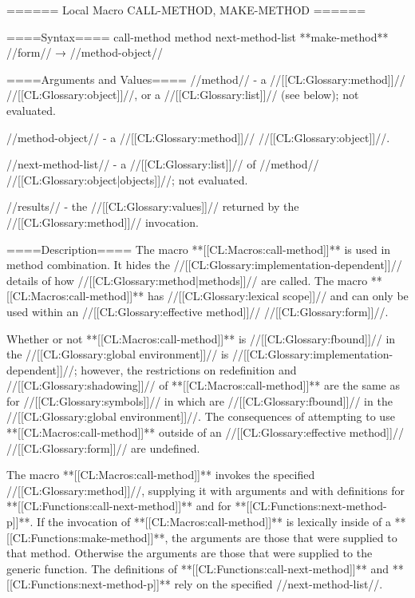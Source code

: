 ====== Local Macro CALL-METHOD, MAKE-METHOD ======

====Syntax====
\DefmacWithValues call-method {method {\optional} next-method-list} {} **make-method** //form// → //method-object//

====Arguments and Values====
//method// - a //[[CL:Glossary:method]]// //[[CL:Glossary:object]]//, or a //[[CL:Glossary:list]]// (see below); not evaluated.

//method-object// - a //[[CL:Glossary:method]]// //[[CL:Glossary:object]]//.

//next-method-list// - a //[[CL:Glossary:list]]// of //method// //[[CL:Glossary:object|objects]]//; not evaluated.

//results// - the //[[CL:Glossary:values]]// returned by the //[[CL:Glossary:method]]// invocation.

====Description====
The macro **[[CL:Macros:call-method]]** is used in method combination. It hides the //[[CL:Glossary:implementation-dependent]]// details of how //[[CL:Glossary:method|methods]]// are called. The macro **[[CL:Macros:call-method]]** has //[[CL:Glossary:lexical scope]]// and can only be used within an //[[CL:Glossary:effective method]]// //[[CL:Glossary:form]]//.


Whether or not **[[CL:Macros:call-method]]** is //[[CL:Glossary:fbound]]// in the //[[CL:Glossary:global environment]]// is //[[CL:Glossary:implementation-dependent]]//; however, the restrictions on redefinition and //[[CL:Glossary:shadowing]]// of **[[CL:Macros:call-method]]** are the same as for //[[CL:Glossary:symbols]]// in  which are //[[CL:Glossary:fbound]]// in the //[[CL:Glossary:global environment]]//. The consequences of attempting to use **[[CL:Macros:call-method]]** outside of an //[[CL:Glossary:effective method]]// //[[CL:Glossary:form]]// are undefined.

The macro **[[CL:Macros:call-method]]** invokes the specified //[[CL:Glossary:method]]//, supplying it with arguments and with definitions for **[[CL:Functions:call-next-method]]** and for **[[CL:Functions:next-method-p]]**. If the invocation of **[[CL:Macros:call-method]]** is lexically inside of a **[[CL:Functions:make-method]]**, the arguments are those that were supplied to that method. Otherwise the arguments are those that were supplied to the generic function. The definitions of **[[CL:Functions:call-next-method]]** and **[[CL:Functions:next-method-p]]** rely on the specified //next-method-list//.


